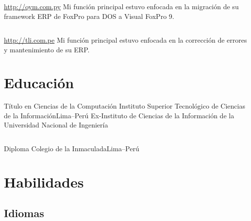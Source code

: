 \documentclass[11pt,a4paper,english]{moderncv}
\begin{document}
\subsection{}

{
\url{http://oym.com.py}
\newline{}
Mi función principal estuvo enfocada en la migración de su framework ERP de FoxPro para DOS a Visual FoxPro 9.
}

\subsection{}

{
\url{http://tli.com.pe}
\newline{}
Mi función principal estuvo enfocada en la corrección de errores y mantenimiento de su ERP.
}

\subsection{}

\section{Educación}
    {Título en Ciencias de la Computación}
    {Instituto Superior Tecnológico de Ciencias de la Información}{Lima--Perú}
    {}{Ex-Instituto de Ciencias de la Información de la Universidad Nacional de Ingeniería}

\subsection{}

    {Diploma}
    {Colegio de la Inmaculada}{Lima--Perú}
    {}{}

\subsection{}
    
\section{Habilidades}

\subsection{Idiomas}
\end{document}
